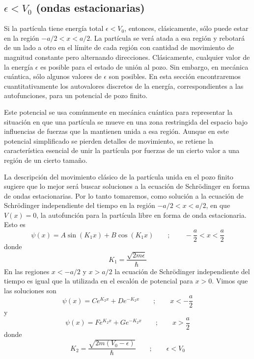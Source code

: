 \documentclass[12pt,a4paper]{article}
\def\e{{\epsilon}} %
\begin{document}
\subsection{$\e < V_{0}$ (ondas estacionarias)}

Si la partícula tiene energía total $\e<V_{0}$, entonces, clásicamente, sólo puede estar en la región $-a/2<x<a/2$. La partícula se verá atada a esa región y rebotará de un lado a otro en el límite de cada región con cantidad de movimiento de magnitud constante pero alternando direcciones. Clásicamente, cualquier valor de la energía $\e$ es posible para el estado de unión al pozo. Sin embargo, en mecánica cuántica, sólo algunos valores de $\e$ son posibles. En esta sección encontraremos cuantitativamente los autovalores discretos de la energía, correspondientes a las autofunciones, para un potencial de pozo finito.

Este potencial se usa comúnmente en mecánica cuántica para representar la situación en que una partícula se mueve en una zona restringida del espacio bajo influencias de fuerzas que la mantienen unida a esa región. Aunque en este potencial simplificado se pierden detalles de movimiento, se retiene la característica esencial de unir la partícula por fuerzas de un cierto valor a una región de un cierto tamaño.

La descripción del movimiento clásico de la partícula unida en el pozo finito sugiere que lo mejor será buscar soluciones a la ecuación de Schrödinger en forma de ondas estacionarias. Por lo tanto tomaremos, como solución a la ecuación de Schrödinger independiente del tiempo en la región $-a/2<x<a/2$, en que $V(x)=0$, la autofunción para la partícula libre en forma de onda estacionaria. Esto es
\[ \psi (x)=A \sin(K_{1}x)+B\cos(K_{1}x) \qquad ; \qquad -\frac{a}{2}<x<\frac{a}{2} \]
donde
\[ K_{1}= \frac{\sqrt{2m\e}}{\hbar} \]
En las regiones $x<-a/2$ y $x>a/2$ la ecuación de Schrödinger independiente del tiempo es igual que la utilizada en el escalón de potencial para $x>0$. Vimos que las soluciones son
\[ \psi(x)=Ce^{K_{2}x}+De^{-K_{2}x} \qquad ; \qquad x<-\frac{a}{2} \]
y
\[ \psi(x)=Fe^{K_{2}x}+Ge^{-K_{2}x} \qquad ; \qquad x>\frac{a}{2} \]
donde
\[ K_{2}=\frac{\sqrt{2m(V_{0}-\e)}}{\hbar} \qquad ; \qquad \e<V_{0} \]
\end{document}

